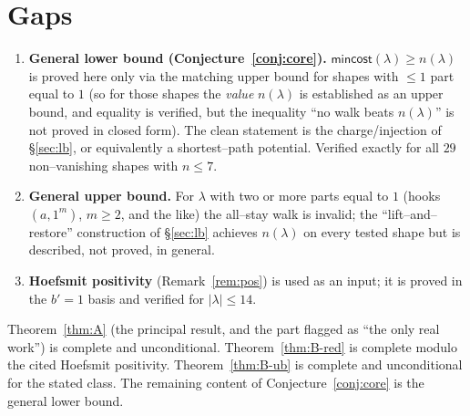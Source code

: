 \documentclass[11pt]{article}
\theoremstyle{definition}
\begin{document}
\section{Gaps}\label{sec:gaps}
\begin{enumerate}[nosep]
\item \textbf{General lower bound (Conjecture~\ref{conj:core}).}
$\mathsf{mincost}(\lambda)\ge n(\lambda)$ is proved here only via the matching
upper bound for shapes with $\le1$ part equal to $1$ (so for those shapes the
\emph{value} $n(\lambda)$ is established as an upper bound, and equality is
verified, but the inequality ``no walk beats $n(\lambda)$'' is not proved in
closed form). The clean statement is the charge/injection of
\S\ref{sec:lb}, or equivalently a shortest--path potential. Verified exactly
for all $29$ non--vanishing shapes with $n\le7$.
\item \textbf{General upper bound.} For $\lambda$ with two or more parts equal
to $1$ (hooks $(a,1^m)$, $m\ge2$, and the like) the all--stay walk is invalid;
the ``lift--and--restore'' construction of \S\ref{sec:lb} achieves
$n(\lambda)$ on every tested shape but is described, not proved, in general.
\item \textbf{Hoefsmit positivity} (Remark~\ref{rem:pos}) is used as an input;
it is proved in the $b'=1$ basis and verified for $|\lambda|\le14$.
\end{enumerate}

Theorem~\ref{thm:A} (the principal result, and the part flagged as ``the only
real work'') is complete and unconditional. Theorem~\ref{thm:B-red} is complete
modulo the cited Hoefsmit positivity. Theorem~\ref{thm:B-ub} is complete and
unconditional for the stated class. The remaining content of
Conjecture~\ref{conj:core} is the general lower bound.
\end{document}
